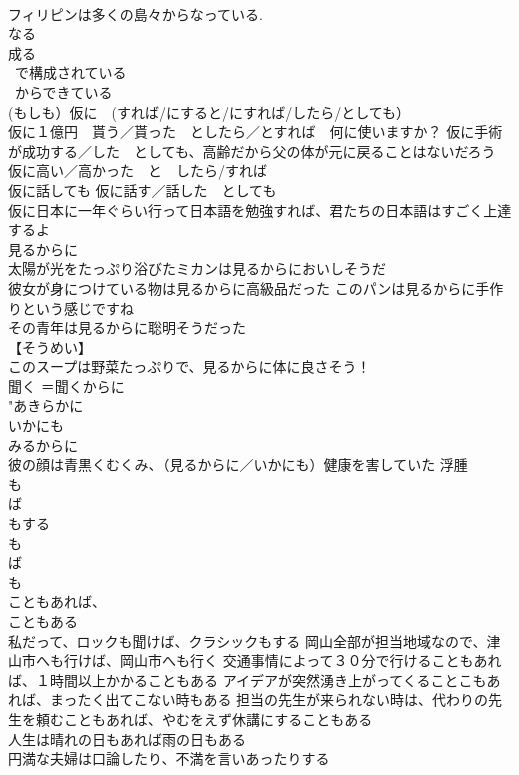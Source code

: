 \documentclass[8pt]{extreport}
\begin{document}
\begin{CJK}{UTF8}{min}
\\	フィリピンは多くの島々からなっている. 
\\	なる 
\\	成る 
\\	~で構成されている 
\\	~からできている 
\\	(もしも）仮に　(すれば/にすると/にすれば/したら/としても）	
\\	仮に１億円　貰う／貰った　としたら／とすれば　何に使いますか？ 仮に手術が成功する／した　としても、高齢だから父の体が元に戻ることはないだろう 
\\	仮に高い／高かった　と　したら/すれば　
\\	仮に話しても 仮に話す／話した　としても　
\\	仮に日本に一年ぐらい行って日本語を勉強すれば、君たちの日本語はすごく上達するよ 
\\	見るからに	
\\	太陽が光をたっぷり浴びたミカンは見るからにおいしそうだ 
\\	彼女が身につけている物は見るからに高級品だった このパンは見るからに手作りという感じですね 
\\	その青年は見るからに聡明そうだった 
\\	【そうめい】 
\\	このスープは野菜たっぷりで、見るからに体に良さそう！	
\\	聞く ＝聞くからに 
\\	"あきらかに 
\\	いかにも 
\\	みるからに 
\\	彼の顔は青黒くむくみ、（見るからに／いかにも）健康を害していた 浮腫 
\\	も
\\	ば 
\\	もする 
\\	も
\\	ば
\\	も 
\\	こともあれば、
\\	こともある	
\\	私だって、ロックも聞けば、クラシックもする 岡山全部が担当地域なので、津山市へも行けば、岡山市へも行く 交通事情によって３０分で行けることもあれば、１時間以上かかることもある アイデアが突然湧き上がってくることこもあれば、まったく出てこない時もある 担当の先生が来られない時は、代わりの先生を頼むこともあれば、やむをえず休講にすることもある 
\\	人生は晴れの日もあれば雨の日もある	
\\	円満な夫婦は口論したり、不満を言いあったりする 

\end{CJK}
\end{document}
